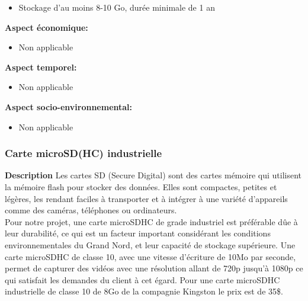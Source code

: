 \begin{itemize}

    \item Stockage d’au moins 8-10 Go, durée minimale de 1 an



\end{itemize}



\noindent\textbf{Aspect économique:}

\begin{itemize}

    \item Non applicable

\end{itemize}



\noindent\textbf{Aspect temporel:}

\begin{itemize}

    \item Non applicable

\end{itemize}



\noindent\textbf{Aspect socio-environnemental:}

\begin{itemize}

    \item Non applicable

\end{itemize}


\subsubsection{Carte microSD(HC) industrielle}
\label{sec:cartesd}
\noindent\textbf{Description} Les cartes SD (Secure Digital) sont des cartes mémoire qui utilisent la mémoire flash pour stocker des données. Elles sont compactes, petites et légères, les rendant faciles à transporter et à intégrer à une variété d’appareils comme des caméras, téléphones ou ordinateurs. 
\\

Pour notre projet, une carte microSDHC de grade industriel est préférable dûe à leur durabilité, ce qui est un facteur important considérant les conditions environnementales du Grand Nord, et leur capacité de stockage supérieure. Une carte microSDHC de classe 10, avec une vitesse d’écriture de 10Mo par seconde, permet de capturer des vidéos avec une résolution allant de 720p jusqu’à 1080p ce qui satisfait les demandes du client à cet égard. Pour une carte microSDHC industrielle de classe 10 de 8Go de la compagnie Kingston le prix est de 35\$.
\smallskip

